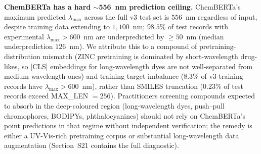 \documentclass[journal=jcisd8,manuscript=article]{achemso}
\begin{document}
\textbf{ChemBERTa has a hard $\sim$556~nm prediction ceiling.} ChemBERTa's maximum predicted $\lambda_{\max}$ across the full v3 test set is $556$~nm regardless of input, despite training data extending to $1{,}100$~nm; $98.5$\% of test records with experimental $\lambda_{\max} > 600$~nm are underpredicted by $\geq 50$~nm (median underprediction $126$~nm). We attribute this to a compound of pretraining-distribution mismatch (ZINC pretraining is dominated by short-wavelength drug-likes, so [CLS] embeddings for long-wavelength dyes are not well-separated from medium-wavelength ones) and training-target imbalance ($8.3$\% of v3 training records have $\lambda_{\max} > 600$~nm), rather than SMILES truncation ($0.23$\% of test records exceed MAX\_LEN $= 256$). Practitioners screening compounds expected to absorb in the deep-coloured region (long-wavelength dyes, push--pull chromophores, BODIPYs, phthalocyanines) should not rely on ChemBERTa's point predictions in that regime without independent verification; the remedy is either a UV-Vis-rich pretraining corpus or substantial long-wavelength data augmentation (Section~S21 contains the full diagnostic).
\end{document}

